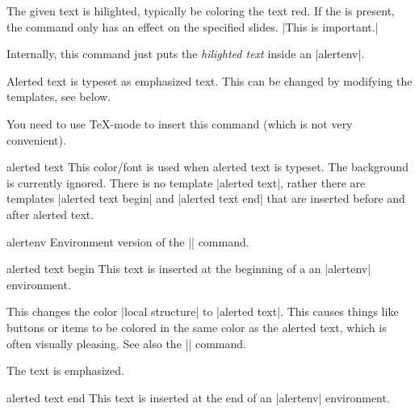\begin{command}{\alert{}}
  The given text is hilighted, typically be coloring the text red. If
  the  is present, the command only has an
  effect on the specified slides.
  \example |This is \alert{important}.|

  Internally, this command just puts the \emph{hilighted text} inside
  an |alertenv|.
  
  \articlenote
  Alerted text is typeset as emphasized text. This can be changed by
  modifying the templates, see below.

  \lyxnote
  You need to use \TeX-mode to insert this command (which is not very
  convenient).

  \begin{element}{alerted text}\no\yes\yes
    This color/font is used when alerted text is typeset. The
    background is currently ignored. There is no template
    |alerted text|, rather there are templates |alerted text begin|
    and |alerted text end| that are inserted before and after alerted
    text.
  \end{element}
\end{command}

\begin{environment}{{alertenv}}
  Environment version of the |\alert| command.

  \begin{element}{alerted text begin}\yes\no\no
    This text is inserted at the beginning of a an |alertenv|
    environment.

    \begin{templateoptions}

      \beamernote
      This changes the color |local structure| to |alerted text|. This
      causes things like buttons or items to be colored in the same
      color as the alerted text, which is often visually pleasing. See
      also the |\structure| command.

      \articlenote
      The text is emphasized.
    \end{templateoptions}
  \end{element}

  \begin{element}{alerted text end}\yes\no\no
    This text is inserted at the end of an |alertenv| environment.
  \end{element}
\end{environment}




